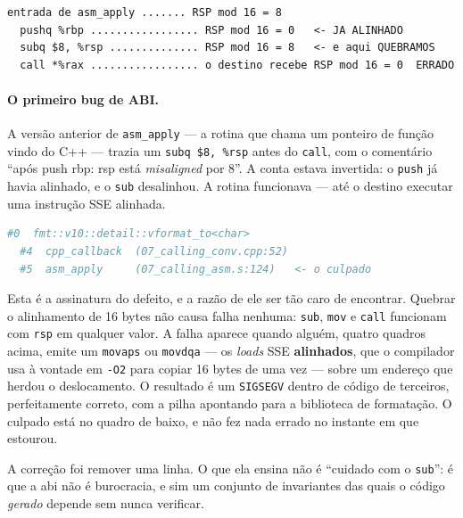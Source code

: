 \begin{lstlisting}[style=bt, language=GAS,
    caption={A conta, linha a linha --- resumo de
             \texttt{src/asm\_course/07\_calling\_asm.s}.}]
  entrada de asm_apply ....... RSP mod 16 = 8
  pushq %rbp ................. RSP mod 16 = 0   <- JA ALINHADO
  subq $8, %rsp .............. RSP mod 16 = 8   <- e aqui QUEBRAMOS
  call *%rax ................. o destino recebe RSP mod 16 = 0  ERRADO
\end{lstlisting}

\paragraph{O primeiro bug de ABI.} A versão anterior de \texttt{asm\_apply}
--- a rotina que chama um ponteiro de função vindo do C++ --- trazia um
\texttt{subq \$8, \%rsp} antes do \texttt{call}, com o comentário ``após push
rbp: rsp está \emph{misaligned} por 8''. A conta estava invertida: o
\texttt{push} já havia alinhado, e o \texttt{sub} desalinhou. A rotina
funcionava --- até o destino executar uma instrução SSE alinhada.

\begin{lstlisting}[style=bt, language=bash,
    caption={A pilha do \emph{crash}, do relato em
             \texttt{src/asm\_course/07\_calling\_asm.s}.}]
  #0  fmt::v10::detail::vformat_to<char>
  #4  cpp_callback  (07_calling_conv.cpp:52)
  #5  asm_apply     (07_calling_asm.s:124)   <- o culpado
\end{lstlisting}

\begin{armadilha}
Esta é a assinatura do defeito, e a razão de ele ser tão caro de encontrar.
Quebrar o alinhamento de 16 bytes não causa falha nenhuma: \texttt{sub},
\texttt{mov} e \texttt{call} funcionam com \texttt{rsp} em qualquer valor. A
falha aparece quando alguém, quatro quadros acima, emite um \texttt{movaps} ou
\texttt{movdqa} --- os \emph{loads} SSE \textbf{alinhados}, que o compilador usa
à vontade em \texttt{-O2} para copiar 16 bytes de uma vez --- sobre um endereço
que herdou o deslocamento. O resultado é um \texttt{SIGSEGV} dentro de código
de terceiros, perfeitamente correto, com a pilha apontando para a biblioteca de
formatação. O culpado está no quadro de baixo, e não fez nada errado no
instante em que estourou.
\end{armadilha}

A correção foi remover uma linha. O que ela ensina não é ``cuidado com o
\texttt{sub}'': é que a \gls{abi} não é burocracia, e sim um conjunto de
invariantes das quais o código \emph{gerado} depende sem nunca verificar.

